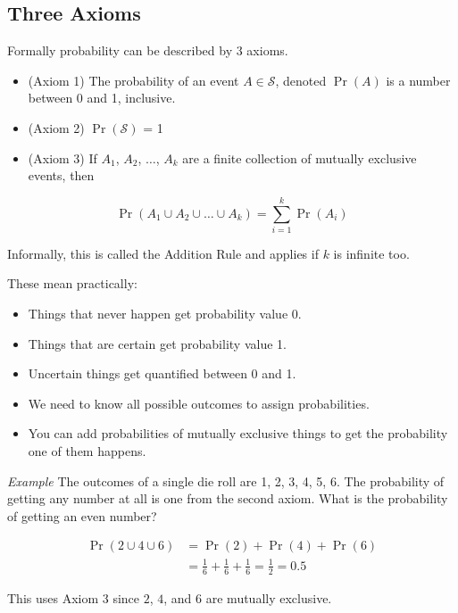 \documentclass[
  oneside]{krantz}
\providecommand{\tightlist}{%
  \setlength{\itemsep}{0pt}\setlength{\parskip}{0pt}}
\begin{document}
\hypertarget{three-axioms}{%
\subsection{Three Axioms}\label{three-axioms}}

Formally probability can be described by 3 axioms.

\begin{itemize}
\item
  (Axiom 1) The probability of an event \(A \in \mathcal{S}\), denoted \(\Pr(A)\) is a number between 0 and 1, inclusive.
\item
  (Axiom 2) \(\Pr(\mathcal{S})\) = 1
\item
  (Axiom 3) If \(A_1\), \(A_2\), \(\ldots\), \(A_k\) are a finite collection of mutually exclusive events, then
\end{itemize}

\[
\Pr(A_1 \cup A_2 \cup \ldots \cup A_k)  =  \sum_{i=1}^k \Pr(A_i)
\]

Informally, this is called the Addition Rule and applies if \(k\) is infinite too.

These mean practically:

\begin{itemize}
\tightlist
\item
  Things that never happen get probability value 0.
\item
  Things that are certain get probability value 1.
\item
  Uncertain things get quantified between 0 and 1.
\item
  We need to know all possible outcomes to assign probabilities.
\item
  You can add probabilities of mutually exclusive things to get the probability one of them happens.
\end{itemize}

\emph{Example} The outcomes of a single die roll are 1, 2, 3, 4, 5, 6. The probability of getting any number at all is one from the second axiom. What is the probability of getting an even number?

\[
\begin{aligned}
         \Pr(2 \cup 4 \cup 6) &= \Pr(2) + \Pr(4) + \Pr(6)\\ 
         &= \frac{1}{6} + \frac{1}{6} + \frac{1}{6} = \frac{1}{2} = 0.5 
\end{aligned}
\]

This uses Axiom 3 since \(2\), \(4\), and \(6\) are mutually exclusive.
\end{document}
